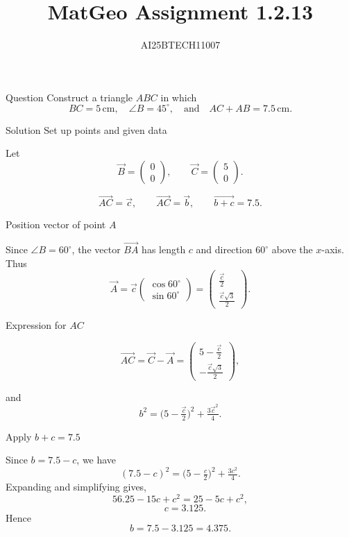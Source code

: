 \documentclass{beamer}
\title 
{MatGeo Assignment 1.2.13}
\author
{AI25BTECH11007}
\begin{document}
\frame{\titlepage}
\begin{frame}{Question}
Construct a triangle $ABC$ in which 
\[
BC = 5 \,\text{cm}, \quad\angle B = 45^\circ, \quad \text{and} \quad AC + AB = 7.5 \,\text{cm}.
\]

\end{frame}

\begin{frame}{Solution}
    \bigskip
 Set up points and given data

Let
\[
\vec{B}=\begin{pmatrix}0\\0\end{pmatrix}, \qquad
\vec{C}=\begin{pmatrix}5\\0\end{pmatrix}.
\]


\[
\vec{AC} = \vec{c}, \qquad \vec{AC} = \vec{b}, \qquad \vec{b+c}=7.5.
\]

 Position vector of point $A$

Since $\angle B=60^\circ$, the vector $\vec{BA}$ has length $c$ and direction $60^\circ$ above the $x$-axis. Thus
\[
\vec{A} = \vec{c}
\begin{pmatrix}\cos 60^\circ \\ \sin 60^\circ\end{pmatrix}
= \begin{pmatrix}\tfrac{\vec{c}}{2}\\[4pt]\tfrac{\vec{c}\sqrt{3}}{2}\end{pmatrix}.
\]

 Expression for $AC$

\[
\vec{AC} = \vec{C} - \vec{A}
= \begin{pmatrix}5-\tfrac{\vec{c}}{2}\\[4pt]-\tfrac{\vec{c}\sqrt{3}}{2}\end{pmatrix},
\]
\end{frame}
\begin{frame}
and
\[
b^2 = \Big(5-\tfrac{\vec{c}}{2}\Big)^2 + \tfrac{3\vec{c}^2}{4}.
\]

  Apply $b+c=7.5$

Since $b=7.5-c$, we have
\[
(7.5-c)^2 = \Big(5-\tfrac{c}{2}\Big)^2 + \tfrac{3c^2}{4}.
\]
Expanding and simplifying gives,
\[
56.25 -15c + c^2 = 25 -5c + c^2,
\]
\[
\quad c=3.125.
\]
Hence
\[
b = 7.5 - 3.125 = 4.375.
\]
\end{frame}
\end{document}
